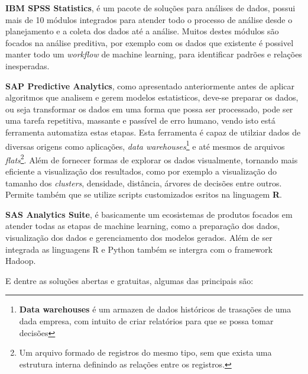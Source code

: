 \begin{alineas}
	\item \textbf{IBM SPSS Statistics}, é um pacote de soluções para análises de dados, possui mais de 10 módulos integrados para 
	atender todo o processo de análise desde o planejamento e a coleta dos dados até a análise. Muitos destes módulos são focados na análise
	preditiva, por exemplo com os dados que existente é possivel manter todo um \textit{workflow} de machine learning, para identificar padrões e relações 
	inesperadas.

	\item \textbf{SAP Predictive Analytics}, como apresentado anteriormente antes de aplicar algoritmos que analisem e gerem modelos estatisticos, deve-se 
	preparar os dados, ou seja transformar os dados em uma forma que possa ser processado, pode ser uma tarefa repetitiva, massante e passível de erro humano, 
	vendo isto está ferramenta automatiza estas etapas. Esta ferramenta é capaz de utilziar dados de diversas origens como aplicações, 
	\textit{data warehouses}\footnote{\textbf{Data warehouses} é um armazen de dados históricos de trasações de uma dada empresa, com intuito de criar relatórios para que
	se possa tomar decisões} e até mesmos de arquivos \textit{flats}\footnote{Um arquivo formado de registros do mesmo tipo, sem que 
	exista uma estrutura interna definindo as relações entre os registros.}. 
	Além de fornecer formas de explorar os dados visualmente, tornando mais eficiente a visualização dos resultados, como por exemplo a visualização 
	do tamanho dos \textit{clusters}, densidade, distância, árvores de decisões entre outros. Permite também que se utilize scripts customizados 
	esritos na linguagem \textbf{R}.

	\item \textbf{SAS Analytics Suite}, é basicamente um ecosistemas de produtos focados em atender todas as etapas de machine learning, como a preparação
	dos dados, visualização dos dados e gerenciamento dos modelos gerados. Além de ser integrada as linguagens R e Python também se intergra com o framework
	Hadoop.	
\end{alineas}

E dentre as soluções abertas e gratuitas, algumas das principais são:

